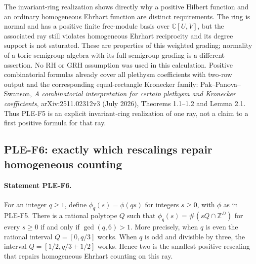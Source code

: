 \documentclass[11pt,a4paper]{article}
\begin{document}
The invariant-ring realization shows directly why a positive Hilbert
function and an ordinary homogeneous Ehrhart function are distinct
requirements. The ring is normal and has a positive finite free-module
basis over $\mathbb C[U,V]$, but the associated ray still violates
homogeneous Ehrhart reciprocity and its degree support is not saturated.
These are properties of this weighted grading; normality of a toric
semigroup algebra with its full semigroup grading is a different assertion.
No RH or GRH assumption was used in this calculation.
Positive combinatorial formulas already cover all plethysm coefficients
with two-row output and the corresponding equal-rectangle Kronecker family:
Pak--Panova--Swanson, \emph{A combinatorial interpretation for certain
plethysm and Kronecker coefficients}, arXiv:2511.02312v3 (July 2026),
Theorems 1.1--1.2 and Lemma 2.1. Thus PLE-F5 is an explicit invariant-ring
realization of one ray, not a claim to a first positive formula for that ray.

\subsection{PLE-F6: exactly which rescalings repair homogeneous counting}
\paragraph{Statement PLE-F6.}
For an integer $q\ge1$, define
$\phi_q(s)=\phi(qs)$ for integers $s\ge0$, with $\phi$ as in PLE-F5.
There is a rational polytope $Q$ such that
$\phi_q(s)=\#(sQ\cap\mathbb Z^D)$ for every $s\ge0$ if and only if
$\gcd(q,6)>1$. More precisely, when $q$ is even the rational interval
$Q=[0,q/3]$ works. When $q$ is odd and divisible by three, the interval
$Q=[1/2,q/3+1/2]$ works. Hence two is the smallest positive rescaling
that repairs homogeneous Ehrhart counting on this ray.
\end{document}
